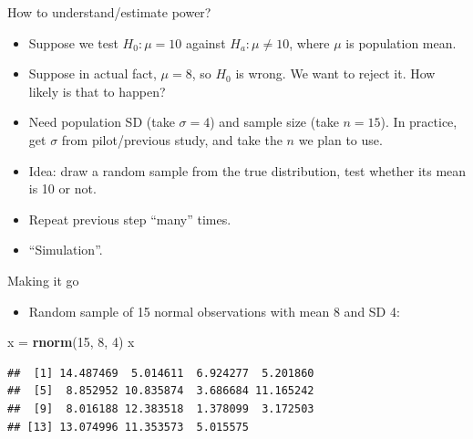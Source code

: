 \documentclass[ignorenonframetext,]{beamer}
\newenvironment{Shaded}{\begin{snugshade}}{\end{snugshade}}
\newcommand{\DecValTok}[1]{\textcolor[rgb]{0.00,0.00,0.81}{#1}}
\newcommand{\KeywordTok}[1]{\textcolor[rgb]{0.13,0.29,0.53}{\textbf{#1}}}
\newcommand{\NormalTok}[1]{#1}
\newcommand{\StringTok}[1]{\textcolor[rgb]{0.31,0.60,0.02}{#1}}
\providecommand{\tightlist}{%
  \setlength{\itemsep}{0pt}\setlength{\parskip}{0pt}}
\begin{document}
\begin{frame}{How to understand/estimate power?}
\protect\hypertarget{how-to-understandestimate-power}{}

\begin{itemize}
\tightlist
\item
  Suppose we test \(H_0 : \mu = 10\) against \(H_a : \mu \ne 10\), where
  \(\mu\) is population mean.
\item
  Suppose in actual fact, \(\mu = 8\), so \(H_0\) is wrong. We want to
  reject it. How likely is that to happen?
\item
  Need population SD (take \(\sigma = 4\)) and sample size (take
  \(n = 15\)). In practice, get \(\sigma\) from pilot/previous study,
  and take the \(n\) we plan to use.
\item
  Idea: draw a random sample from the true distribution, test whether
  its mean is 10 or not.
\item
  Repeat previous step ``many'' times.
\item
  ``Simulation''.
\end{itemize}

\end{frame}

\begin{frame}[fragile]{Making it go}
\protect\hypertarget{making-it-go}{}

\begin{itemize}
\tightlist
\item
  Random sample of 15 normal observations with mean 8 and SD 4:
\end{itemize}

\begin{Shaded}
\begin{Highlighting}[]
\NormalTok{x =}\StringTok{ }\KeywordTok{rnorm}\NormalTok{(}\DecValTok{15}\NormalTok{, }\DecValTok{8}\NormalTok{, }\DecValTok{4}\NormalTok{)}
\NormalTok{x}
\end{Highlighting}
\end{Shaded}

\begin{verbatim}
##  [1] 14.487469  5.014611  6.924277  5.201860
##  [5]  8.852952 10.835874  3.686684 11.165242
##  [9]  8.016188 12.383518  1.378099  3.172503
## [13] 13.074996 11.353573  5.015575
\end{verbatim}

\end{frame}
\end{document}
